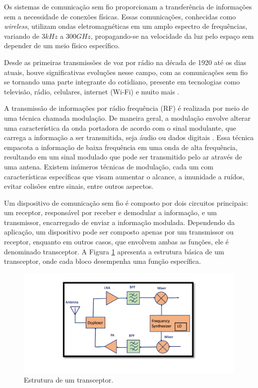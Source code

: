 Os sistemas de comunicação sem fio proporcionam a transferência de informações sem a necessidade de conexões físicas. Essas comunicações, conhecidas como \textit{wireless}, utilizam ondas eletromagnéticas em um amplo espectro de frequências, variando de $3kHz$ a $300GHz$, propagando-se na velocidade da luz pelo espaço sem depender de um meio físico específico.

Desde as primeiras transmissões de voz por rádio na década de 1920 até os dias atuais, houve significativas evoluções nesse campo, com as comunicações sem fio se tornando uma parte integrante do cotidiano, presente em tecnologias como televisão, rádio, celulares, internet (Wi-Fi) e muito mais \cite{dowla2003handbook}.

A transmissão de informações por rádio frequência (RF) é realizada por meio de uma técnica chamada modulação. De maneira geral, a modulação envolve alterar uma característica da onda portadora de acordo com o sinal modulante, que carrega a informação a ser transmitida, seja áudio ou dados digitais \cite{engtadeu2011}. Essa técnica empacota a informação de baixa frequência em uma onda de alta frequência, resultando em um sinal modulado que pode ser transmitido pelo ar através de uma antena. Existem inúmeros técnicas de modulação, cada um com características específicas que visam aumentar o alcance, a imunidade a ruídos, evitar colisões entre sinais, entre outros aspectos.

Um dispositivo de comunicação sem fio é composto por dois circuitos principais: um receptor, responsável por receber e demodular a informação, e um transmissor, encarregado de enviar a informação modulada. Dependendo da aplicação, um dispositivo pode ser composto apenas por um transmissor ou receptor, enquanto em outros casos, que envolvem ambas as funções, ele é denominado transceptor. A Figura \ref{fig:tranceiver_structure} apresenta a estrutura básica de um transceptor, onde cada bloco desempenha uma função específica.
\begin{figure}[htb]
	\caption{Estrutura de um transceptor.}
	\begin{center}
		\includegraphics[scale=0.6]{img/tranceiver_structure.png}
	\end{center}
	\label{fig:tranceiver_structure}
\end{figure}



